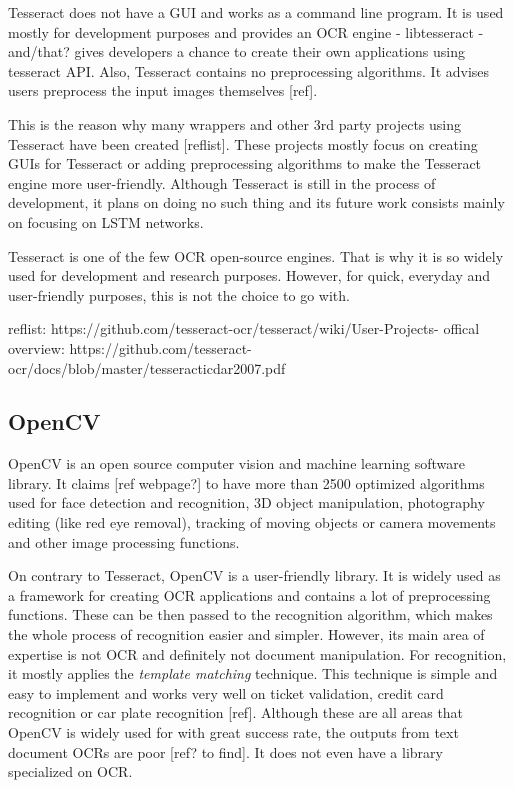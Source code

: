 Tesseract does not have a GUI and works as a command line program. It is used mostly for development purposes and provides an OCR engine - libtesseract - and/that? gives developers a chance to create their own applications using tesseract API. Also, Tesseract contains no preprocessing algorithms. It advises users preprocess the input images themselves [ref].

This is the reason why many wrappers and other 3rd party projects using Tesseract have been created [reflist]. These projects mostly focus on creating GUIs for Tesseract or adding preprocessing algorithms to make the Tesseract engine more user-friendly. Although Tesseract is still in the process of development, it plans on doing no such thing and its future work consists mainly on focusing on LSTM networks.

Tesseract is one of the few OCR open-source engines. That is why it is so widely used for development and research purposes. However, for quick, everyday and user-friendly purposes, this is not the choice to go with.

reflist: https://github.com/tesseract-ocr/tesseract/wiki/User-Projects-%
offical overview: https://github.com/tesseract-ocr/docs/blob/master/tesseracticdar2007.pdf


\subsection{OpenCV}

OpenCV is an open source computer vision and machine learning software library. It claims [ref webpage?] to have more than 2500 optimized algorithms used for face detection and recognition, 3D object manipulation, photography editing (like red eye removal), tracking of moving objects or camera movements and other image processing functions.

On contrary to Tesseract, OpenCV is a user-friendly library. It is widely used as a framework for creating OCR applications and contains a lot of preprocessing functions. These can be then passed to the recognition algorithm, which makes the whole process of recognition easier and simpler. However, its main area of expertise is not OCR and definitely not document manipulation. For recognition, it mostly applies the \emph{template matching} technique. This technique is simple and easy to implement and works very well on ticket validation, credit card recognition or car plate recognition [ref]. Although these are all areas that OpenCV is widely used for with great success rate, the outputs from text document OCRs are poor [ref? to find]. It does not even have a library specialized on OCR.

